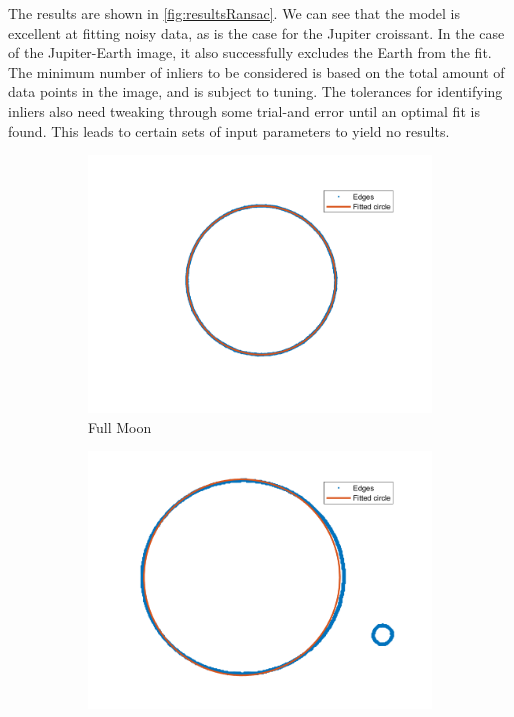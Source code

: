 The results are shown in \autoref{fig:resultsRansac}. We can see that the model is excellent at fitting noisy data, as is the case for the Jupiter croissant. In the case of the Jupiter-Earth image, it also successfully excludes the Earth from the fit. The minimum number of inliers to be considered is based on the total amount of data points in the image, and is subject to tuning. The tolerances for identifying inliers also need tweaking through some trial-and error until an optimal fit is found. This leads to certain sets of input parameters to yield no results.
\begin{figure}[!ht]
    \centering
    \begin{subfigure}{0.32\textwidth}
        \centering
        \includegraphics[width=\textwidth]{Doc/Graphics/Part3/RANSAC_moon.png}
        \caption{Full Moon}
    \end{subfigure}
    \hfill
    \begin{subfigure}{0.32\textwidth}
        \centering
        \includegraphics[width=\textwidth]{Doc/Graphics/Part3/RANSAC_jupiter_earth.png}

\end{subfigure}
\end{figure}

